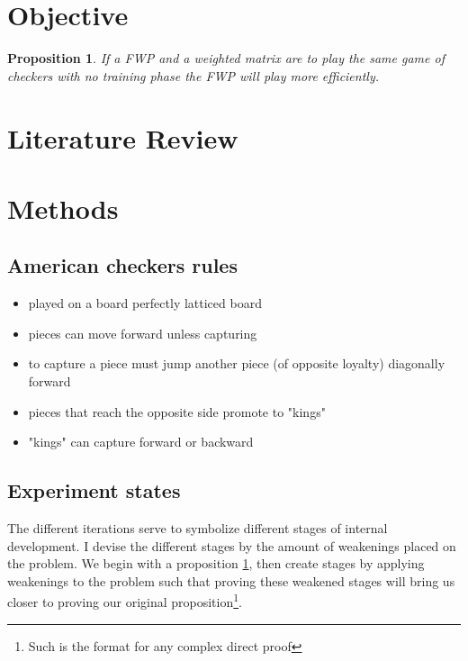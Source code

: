 \documentclass[12pt]{article}
\newtheorem{prop}{Proposition}
\begin{document}
	\maketitle
	\tableofcontents

	\newpage


	\section{Objective}
		\begin{prop} \label{prop:1}
			If a FWP and a weighted matrix are to play the same game of checkers with no training phase the FWP
			will play more efficiently.
		\end{prop}

	\section{}

	\section{}

	\section{Literature Review}

	\section{Methods}
		\subsection{American checkers rules} \label{sec:rules}
			\begin{itemize}
				\item played on a board perfectly latticed board
				\item pieces can move forward unless capturing
				\item to capture a piece must jump another piece (of opposite loyalty) diagonally forward
				\item pieces that reach the opposite side promote to "kings"
				\item "kings" can capture forward or backward
			\end{itemize}
		\subsection{Experiment states}
			\indent The different iterations serve to symbolize different stages of internal development. I devise
			the different stages by the amount of weakenings placed on the problem. We begin with a proposition
			\ref{prop:1}, then create stages by applying weakenings to the problem such that proving these
			weakened stages will bring us closer to proving our original proposition\footnote{Such is the format
			for any complex direct proof}.



	\nocite{*}

	\newpage %
	\backmatter
	\printbibliography

	\newpage %
	\printindex

	\newpage %
	\appendix
\end{document}
